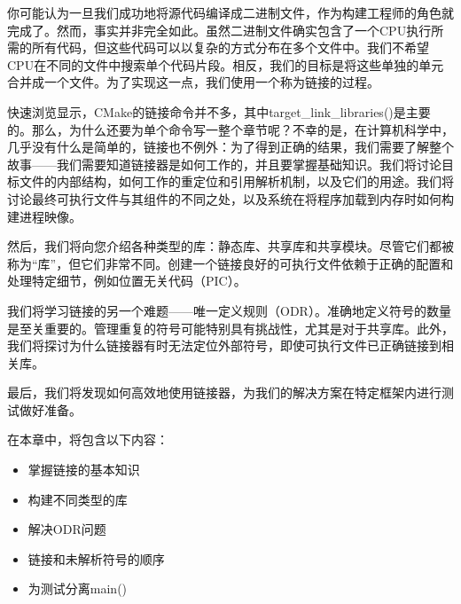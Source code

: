 你可能认为一旦我们成功地将源代码编译成二进制文件，作为构建工程师的角色就完成了。然而，事实并非完全如此。虽然二进制文件确实包含了一个CPU执行所需的所有代码，但这些代码可以以复杂的方式分布在多个文件中。我们不希望CPU在不同的文件中搜索单个代码片段。相反，我们的目标是将这些单独的单元合并成一个文件。为了实现这一点，我们使用一个称为链接的过程。

快速浏览显示，CMake的链接命令并不多，其中target\_link\_libraries()是主要的。那么，为什么还要为单个命令写一整个章节呢？不幸的是，在计算机科学中，几乎没有什么是简单的，链接也不例外：为了得到正确的结果，我们需要了解整个故事——我们需要知道链接器是如何工作的，并且要掌握基础知识。我们将讨论目标文件的内部结构，如何工作的重定位和引用解析机制，以及它们的用途。我们将讨论最终可执行文件与其组件的不同之处，以及系统在将程序加载到内存时如何构建进程映像。

然后，我们将向您介绍各种类型的库：静态库、共享库和共享模块。尽管它们都被称为“库”，但它们非常不同。创建一个链接良好的可执行文件依赖于正确的配置和处理特定细节，例如位置无关代码（PIC）。

我们将学习链接的另一个难题——唯一定义规则（ODR）。准确地定义符号的数量是至关重要的。管理重复的符号可能特别具有挑战性，尤其是对于共享库。此外，我们将探讨为什么链接器有时无法定位外部符号，即使可执行文件已正确链接到相关库。

最后，我们将发现如何高效地使用链接器，为我们的解决方案在特定框架内进行测试做好准备。

在本章中，将包含以下内容：

\begin{itemize}
\item
掌握链接的基本知识

\item
构建不同类型的库

\item
解决ODR问题

\item
链接和未解析符号的顺序

\item
为测试分离main()
\end{itemize}











































